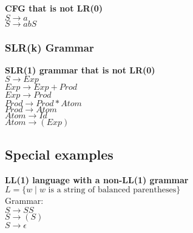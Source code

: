 \textbf{CFG that is not LR(0)}\\ %
    $S \rightarrow a$\\
    $S \rightarrow abS$\\
    

\subsubsection{SLR(k) Grammar}
\textbf{SLR(1) grammar that is not LR(0)}\\ %
    $S\rightarrow Exp$\\
    $Exp\rightarrow Exp + Prod$\\
    $Exp\rightarrow Prod$\\
    $Prod\rightarrow Prod * Atom$\\
    $Prod\rightarrow Atom$\\
    $Atom\rightarrow Id$\\
    $Atom\rightarrow (Exp)$\\

\subsection{Special examples}
\textbf{LL(1) language with a non-LL(1) grammar}
    $L = \{ w \mid w \text{ is a string of balanced parentheses} \}$\\
Grammar:\\
    $S \rightarrow S S$\\
    $S \rightarrow ( S )$\\
    $S \rightarrow \epsilon$\\


